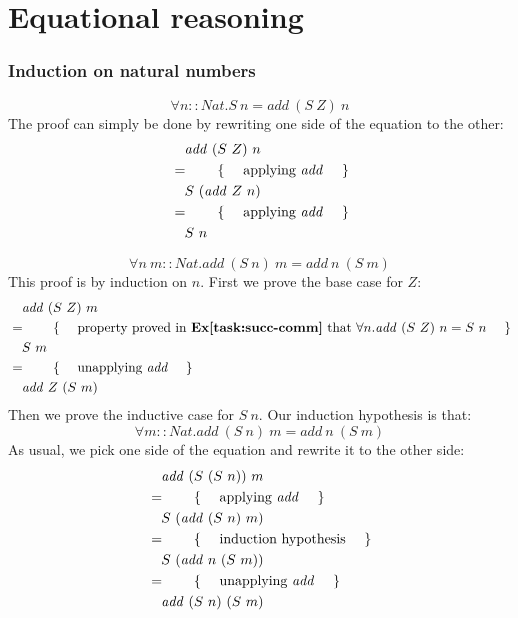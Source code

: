 \pagebreak \section{Equational reasoning}

\subsubsection{Induction on natural numbers}

\begin{displaymath}
\forall n :: \mathit{Nat} . S~n = \mathit{add}~(S~Z)~n
\end{displaymath}
The proof can simply be done by rewriting one side of the equation to the other:
\begin{align*}
&\quad \mathit{add}~(S~Z)~n\\
&=\qquad\text{\{\quad\ applying $\mathit{add}$ \quad\}}\\
&\quad S~(\mathit{add}~Z~n)\\
&=\qquad\text{\{\quad\ applying $\mathit{add}$ \quad\}}\\
&\quad S~n
\end{align*}

\begin{displaymath}
\forall n~m :: \mathit{Nat} . \mathit{add}~(S~n)~m = \mathit{add}~n~(S~m)
\end{displaymath}
This proof is by induction on $n$. First we prove the base case for $Z$:
\begin{align*}
&\quad \mathit{add}~(S~Z)~m\\
&=\qquad\text{\{\quad\ property proved in \textbf{Ex\ref{task:succ-comm}} that $\forall n.\mathit{add}~(S~Z)~n=S~n$ \quad\}}\\
&\quad S~m\\
&=\qquad\text{\{\quad\ unapplying $\mathit{add}$ \quad\}}\\
&\quad \mathit{add}~Z~(S~m)
\end{align*}
Then we prove the inductive case for $S~n$. Our induction hypothesis is that:
\begin{displaymath}
\forall m :: \mathit{Nat} . \mathit{add}~(S~n)~m = \mathit{add}~n~(S~m)
\end{displaymath}
As usual, we pick one side of the equation and rewrite it to the other side:
\begin{align*}
&\quad \mathit{add}~(S~(S~n))~m\\
&=\qquad\text{\{\quad\ applying $\mathit{add}$ \quad\}}\\
&\quad S~(\mathit{add}~(S~n)~m)\\
&=\qquad\text{\{\quad\ induction hypothesis \quad\}}\\
&\quad S~(\mathit{add}~n~(S~m))\\
&=\qquad\text{\{\quad\ unapplying $\mathit{add}$ \quad\}}\\
&\quad \mathit{add}~(S~n)~(S~m)
\end{align*}

